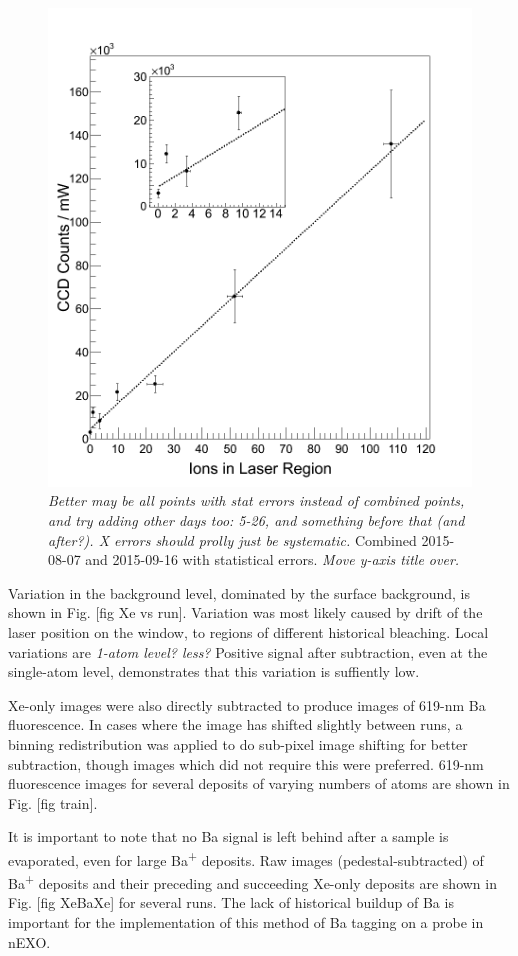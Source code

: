 \begin{figure} %
        \centering
                \includegraphics[width=.7\textwidth]{figures/fitgrouped_20150807_20150916_inset.png}
                \caption{\emph{\color{gray}Better may be all points with stat errors instead of combined points, and try adding other days too:  5-26, and something before that (and after?).  X errors should prolly just be systematic.}  Combined 2015-08-07 and 2015-09-16 with statistical errors.  \emph{\color{gray}Move y-axis title over.}}
\label{fig:lin}
\end{figure}

Variation in the background level, dominated by the surface background, is shown in Fig. [fig Xe vs run].  Variation was most likely caused by drift of the laser position on the window, to regions of different historical bleaching.  Local variations are \emph{\color{gray}1-atom level?  less?}  Positive signal after subtraction, even at the single-atom level, demonstrates that this variation is suffiently low.

Xe-only images were also directly subtracted to produce images of 619-nm Ba fluorescence.  In cases where the image has shifted slightly between runs, a binning redistribution was applied to do sub-pixel image shifting for better subtraction, though images which did not require this were preferred.  619-nm fluorescence images for several deposits of varying numbers of atoms are shown in Fig. [fig train].  

It is important to note that no Ba signal is left behind after a sample is evaporated, even for large Ba\textsuperscript{+} deposits.  Raw images (pedestal-subtracted) of Ba\textsuperscript{+} deposits and their preceding and succeeding Xe-only deposits are shown in Fig. [fig XeBaXe] for several runs.  The lack of historical buildup of Ba is important for the implementation of this method of Ba tagging on a probe in nEXO.

